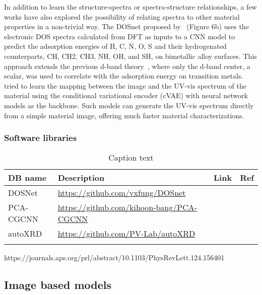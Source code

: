 \documentclass[pdflatex,sn-mathphys]{sn-jnl}%
\theoremstyle{thmstyleone}%
\theoremstyle{thmstyletwo}%
\theoremstyle{thmstylethree}%
\begin{document}
In addition to learn the structure-spectra or spectra-structure relationships, a few works have also explored the possibility of relating spectra to other material properties in a non-trivial way. The DOSnet proposed by~\cite{Fung.33} (Figure 6b) uses the electronic DOS spectra calculated from DFT as inputs to a CNN model to predict the adsorption energies of H, C, N, O, S and their hydrogenated counterparts, CH, CH2, CH3, NH, OH, and SH,  on bimetallic alloy surfaces. This approach extends the previous d-band theory~\cite{34}, where only the d-band center, a scalar, was used to correlate with the adsorption energy on transition metals. \cite{Stein.35} tried to learn the mapping between the image and the UV-vis spectrum of the material using the conditional variational encoder (cVAE) with neural network models as the backbone. Such models can generate the UV-vis spectrum directly from a simple material image, offering much faster material characterizations.

\subsubsection{Software libraries }
\begin{table}[h]

\begin{minipage}{174pt}
\caption{Caption text}\label{tab:spectral-data}%
\begin{tabular}{@{}llll@{}}
\toprule
DB name & Description & Link  & Ref\\
\midrule
DOSNet   &  \url{https://github.com/vxfung/DOSnet}   & \cite{fung2021machine}  \\
PCA-CGCNN   &  \url{https://github.com/kihoon-bang/PCA-CGCNN}   & \cite{bang2021accelerated}  \\
autoXRD   &  \url{https://github.com/PV-Lab/autoXRD}   & \cite{?}  \\

\botrule
\end{tabular}
\end{minipage}
\end{table}
https://journals.aps.org/prl/abstract/10.1103/PhysRevLett.124.156401
\subsection{Image based models}\label{sec:image}
\end{document}

